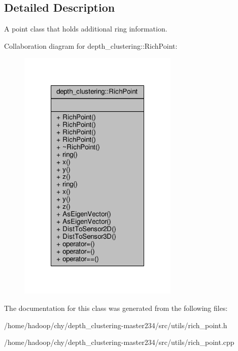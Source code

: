 \subsection{Detailed Description}
A point class that holds additional ring information. 

Collaboration diagram for depth\-\_\-clustering\-:\-:Rich\-Point\-:
\nopagebreak
\begin{figure}[H]
\begin{center}
\leavevmode
\includegraphics[width=216pt]{classdepth__clustering_1_1RichPoint__coll__graph}
\end{center}
\end{figure}


The documentation for this class was generated from the following files\-:\begin{DoxyCompactItemize}
\item 
/home/hadoop/chy/depth\-\_\-clustering-\/master234/src/utils/rich\-\_\-point.\-h\item 
/home/hadoop/chy/depth\-\_\-clustering-\/master234/src/utils/rich\-\_\-point.\-cpp\end{DoxyCompactItemize}
